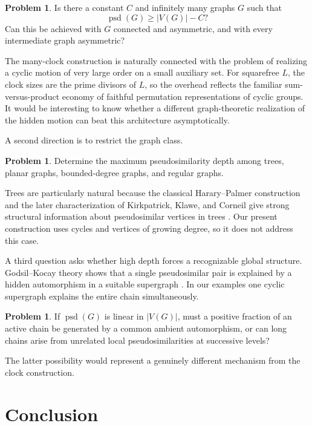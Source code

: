 \documentclass[11pt]{article}
\theoremstyle{definition}
\newtheorem{problem}[theorem]{Problem}
\theoremstyle{remark}
\newcommand{\psd}{\operatorname{psd}}
\begin{document}
\begin{problem}
Is there a constant $C$ and infinitely many graphs $G$ such that
\[
    \psd(G)\ge |V(G)|-C?
\]
Can this be achieved with $G$ connected and asymmetric, and with every intermediate graph asymmetric?
\end{problem}

The many-clock construction is naturally connected with the problem of realizing a cyclic motion of very large order on a small auxiliary set. For squarefree $L$, the clock sizes are the prime divisors of $L$, so the overhead reflects the familiar sum-versus-product economy of faithful permutation representations of cyclic groups. It would be interesting to know whether a different graph-theoretic realization of the hidden motion can beat this architecture asymptotically.

A second direction is to restrict the graph class.

\begin{problem}
Determine the maximum pseudosimilarity depth among trees, planar graphs, bounded-degree graphs, and regular graphs.
\end{problem}

Trees are particularly natural because the classical Harary--Palmer construction and the later characterization of Kirkpatrick, Klawe, and Corneil give strong structural information about pseudosimilar vertices in trees \cite{HararyPalmer1966,KirkpatrickKlaweCorneil1983,Lauri1997}. Our present construction uses cycles and vertices of growing degree, so it does not address this case.

A third question asks whether high depth forces a recognizable global structure. Godsil--Kocay theory shows that a single pseudosimilar pair is explained by a hidden automorphism in a suitable supergraph \cite{GodsilKocay1982}. In our examples one cyclic supergraph explains the entire chain simultaneously.

\begin{problem}
If $\psd(G)$ is linear in $|V(G)|$, must a positive fraction of an active chain be generated by a common ambient automorphism, or can long chains arise from unrelated local pseudosimilarities at successive levels?
\end{problem}

The latter possibility would represent a genuinely different mechanism from the clock construction.

\section{Conclusion}
\end{document}
